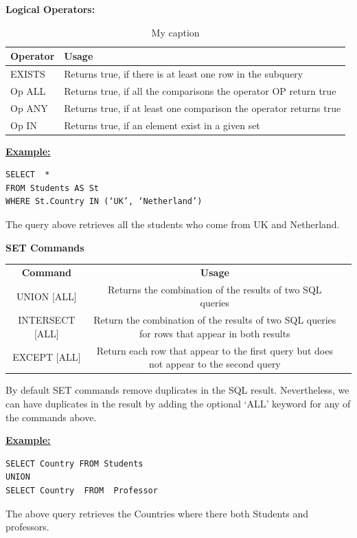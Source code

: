 \noindent\textbf{Logical  Operators:}
\begin{table}[h]
\centering
\caption{My caption}
\label{my-label}
\begin{tabular}{|p{2cm}|p{11.5cm}| }
\hline
\textbf{Operator} & \textbf{Usage}                                                     \\ \hline
EXISTS            & Returns true, if there is at least one row in the subquery         \\ \hline
Op ALL            & Returns true, if all the comparisons the operator OP return true   \\ \hline
Op ANY            & Returns true, if at least one comparison the operator returns true \\ \hline
Op IN             & Returns true, if an element exist in a given set                   \\ \hline
\end{tabular}
\end{table}

\hfill\newpage
\noindent\textbf{\underline{Example:}}
\begin{mdframed}[backgroundcolor=lightgray!20] 
\begin{lstlisting}[style=SQL]
SELECT  *
FROM Students AS St 
WHERE St.Country IN (‘UK’, ‘Netherland’)
\end{lstlisting}
\end{mdframed}
The query above  retrieves all the students who come from UK and Netherland.


\noindent\textbf{ SET Commands}
\begin{tabular}{c:cc} 
   \textbf{Command} & \textbf{Usage}  \\ 
   UNION [ALL] & Returns the combination of the results of two SQL 	  queries \\ 
   INTERSECT [ALL] & Return the combination of the results of two 	 SQL queries for rows that appear in both results   \\ 
   EXCEPT [ALL] & Return each row that appear to the first query 	but does not appear to the second query  \\
   \hline
\end{tabular}

By default SET commands remove duplicates in the SQL result. Nevertheless, we can have duplicates in the result by adding the optional ‘ALL’ keyword for any of the commands above.  

\noindent\textbf{\underline{Example:}}
\begin{mdframed}[backgroundcolor=lightgray!20] 
\begin{lstlisting}[style=SQL]
SELECT Country FROM Students 
UNION
SELECT Country  FROM  Professor
\end{lstlisting}
\end{mdframed}
The above query retrieves the Countries where there both Students and professors. 

